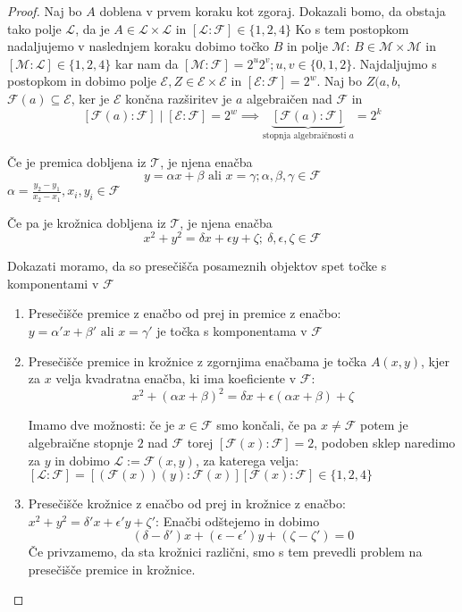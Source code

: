 \documentclass[a4paper]{article}
\begin{document}
\begin{proof}
Naj bo $A$ doblena v prvem koraku kot zgoraj. Dokazali bomo, da obstaja tako polje $\mathcal{L}$, da je $A \in \mathcal{L} \times \mathcal{L}$ in $[\mathcal{L}:\mathcal{F}] \in \{1,2,4\}$ Ko s tem postopkom nadaljujemo v naslednjem koraku dobimo točko $B$ in polje $\mathcal{M}$: $B \in \mathcal{M} \times \mathcal{M}$ in $[\mathcal{M}:\mathcal{L}] \in \{1,2,4\}$ kar nam da $[\mathcal{M}:\mathcal{F}] = 2^u2^v; u,v \in \{0,1,2\}$. Najdaljujmo s postopkom in dobimo polje $\mathcal{E}, Z \in \mathcal{E} \times \mathcal{E}$ in $[\mathcal{E}:\mathcal{F}] = 2^w$. Naj bo $Z(a,b$, $\mathcal{F}(a) \subseteq \mathcal{E}$, ker je $\mathcal{E}$ končna razširitev je $a$ algebraičen nad $\mathcal{F}$ in 
$$[\mathcal{F}(a):\mathcal{F}] \mid [\mathcal{E}:\mathcal{F}] = 2^w \implies \underbrace{[\mathcal{F}(a):\mathcal{F}]}_{\text{stopnja algebraičnosti } a} = 2^k$$

Če je premica dobljena iz $\mathcal{T}$, je njena enačba
\begin{equation}
y = \alpha x + \beta \text{ ali } x = \gamma; \alpha, \beta, \gamma \in \mathcal{F}
\end{equation}
$\alpha = \frac{y_2 - y_1}{x_2 - x_1}, x_i, y_i \in \mathcal{F}$

Če pa je krožnica dobljena iz $\mathcal{T}$, je njena enačba
\begin{equation}
x^2 + y^2 = \delta x + \epsilon y + \zeta; \ \delta, \epsilon, \zeta \in \mathcal{F}
\end{equation}

Dokazati moramo, da so presečišča posameznih objektov spet točke s komponentami v $\mathcal{F}$


\begin{enumerate}
\item Presečišče premice z enačbo od prej in premice z enačbo: $y = \alpha' x + \beta' \text{ ali } x = \gamma'$ je točka s komponentama v $\mathcal{F}$

\item Presečišče premice in krožnice z zgornjima enačbama je točka $A(x,y)$, kjer za $x$ velja kvadratna enačba, ki ima koeficiente v $\mathcal{F}$:
$$x^2 + (\alpha x + \beta)^2 = \delta x + \epsilon(\alpha x + \beta) + \zeta$$ 

Imamo dve možnosti: če je $x \in \mathcal{F}$ smo končali, če pa $x \neq \mathcal{F}$ potem je algebraične stopnje $2$ nad $\mathcal{F}$ torej $[\mathcal{F}(x):\mathcal{F}] = 2$, podoben sklep naredimo za $y$ in dobimo $\mathcal{L} := \mathcal{F}(x,y)$, za katerega velja: $[\mathcal{L}:\mathcal{F}] = [(\mathcal{F}(x))(y):\mathcal{F}(x)][\mathcal{F}(x):\mathcal{F}] \in \{1,2,4\}$ 

\item Presečišče krožnice z enačbo od prej in krožnice z enačbo: $x^2 + y^2 = \delta' x + \epsilon' y + \zeta'$: Enačbi odštejemo in dobimo 
$$(\delta - \delta')x + (\epsilon - \epsilon')y + (\zeta - \zeta') = 0$$
Če privzamemo, da sta krožnici različni, smo s tem prevedli problem na presečišče premice in krožnice.
\end{enumerate}

\end{proof}
\end{document}
